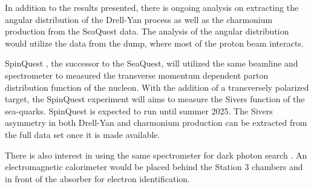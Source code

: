 \documentclass[../main.tex]{subfiles}
\begin{document}
In addition to the results presented, there is ongoing analysis on extracting 
the angular distribution of the Drell-Yan process as well as the charmonium 
production from the SeaQuest data. The analysis of the angular distribution would 
utilize the data from the dump, where most of the proton beam interacts.

SpinQuest \cite{geesaman2014}, the successor to the SeaQuest, will utilized the same beamline and 
spectrometer to measured the transverse momentum dependent parton distribution 
function of the nucleon. With the addition of a transversely polarized  
target, the SpinQuest experiment will aims to measure the Sivers function of the
sea-quarks.
SpinQuest is expected to run until summer 2025. The Sivers
asymmetry in both Drell-Yan and charmonium production can be extracted from the full
data set once it is made available.

There is also interest in using the same spectrometer for dark photon search
\cite{apyan2022}. An electromagnetic calorimeter would be placed behind the 
Station 3 chambers and in front of the absorber for electron identification.

\ifSubfilesClassLoaded{ \printbibliography[heading=bibintoc,title={References}]}{}
\end{document}
